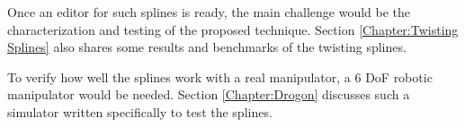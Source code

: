{{        Once an editor for such splines is ready, the main challenge would be the characterization and testing of the proposed technique. Section \ref{Chapter:Twisting Splines} also shares some results and benchmarks of the twisting splines.
        
        To verify how well the splines work with a real manipulator, a $6$ DoF robotic manipulator would be needed. Section \ref{Chapter:Drogon} discusses such a simulator written specifically to test the splines.
    }    
}
